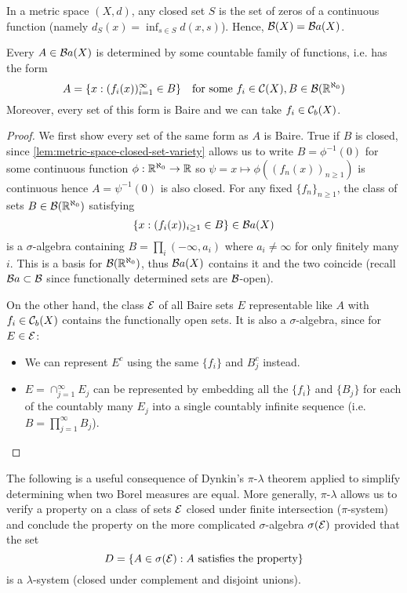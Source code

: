 \begin{lemma}
  \label{lem:metric-space-closed-set-variety}
  In a metric space $(X, d)$, any closed set $S$ is the set of zeros of a continuous
  function (namely $d_S(x) = \inf_{s \in S} d(x,s)$).
  Hence, $\mathcal{B}(X) = \mathcal{B}a(X)$.
\end{lemma}

\begin{lemma}
  \label{lem:baire-set-countably-determined}
  Every $A \in \mathcal{B}a(X)$ is determined by some countable family of functions,
  i.e. has the form
  \[
  A = \{x : (f_i(x))_{i=1}^\infty \in B \}
  \quad\text{for some}~f_i \in \mathcal{C}(X), B \in \mathcal{B}(\mathbb{R}^{\aleph_0})
  \]
  Moreover, every set of this form is Baire and
  we can take $f_i \in \mathcal{C}_b(X)$.
\end{lemma}

\begin{proof}
  We first show every set of the same form as $A$ is Baire.
  True if $B$ is closed, since \cref{lem:metric-space-closed-set-variety}
  allows us to write $B = \phi^{-1}(0)$ for some continuous function $\phi :
  \mathbb{R}^{\aleph_0} \to \mathbb{R}$ so $\psi = x \mapsto \phi((f_n(x))_{n \geq 1})$ is
  continuous hence $A = \psi^{-1}(0)$ is also closed.
  For any fixed $\{f_n\}_{n \geq 1}$, the class of
  sets $B \in \mathcal{B}(\mathbb{R}^{\aleph_0})$ satisfying
  \[
    \{ x : (f_i(x))_{i \geq 1} \in B \} \in \mathcal{B}a(X)
  \]
  is a $\sigma$-algebra containing
  $B = \prod_{i} (-\infty, a_i)$
  where $a_i \neq \infty$ for only finitely many $i$.
  This is a basis for $\mathcal{B}(\mathbb{R}^{\aleph_0})$, thus $\mathcal{B}a(X)$
  contains it and the two coincide (recall $\mathcal{B}a \subset \mathcal{B}$ since
  functionally determined sets are $\mathcal{B}$-open).

  On the other hand, the class $\mathcal{E}$ of all Baire sets $E$
  representable like $A$ with $f_i \in \mathcal{C}_b(X)$ contains
  the functionally open sets. It is also a $\sigma$-algebra, since
  for $E \in \mathcal{E}$:
  \begin{itemize}
    \item We can represent $E^c$ using the same $\{f_i\}$
      and $B_j^c$ instead.
    \item $E = \cap_{j=1}^\infty E_j$ can be represented by
      embedding all the $\{f_i\}$ and $\{B_j\}$ for each
      of the countably many $E_j$ into a single countably
      infinite sequence (i.e. $B = \prod_{j=1}^\infty B_j$).
  \end{itemize}
\end{proof}

The following is a useful consequence of Dynkin's $\pi$-$\lambda$ theorem
applied to simplify determining when two Borel measures are equal.
More generally, $\pi$-$\lambda$ allows us to verify a property on a
class of sets $\mathcal{E}$ closed under finite intersection ($\pi$-system)
and conclude the property on the more complicated
$\sigma$-algebra $\sigma(\mathcal{E})$ provided that the set
\[
  D = \{ A \in \sigma(\mathcal{E}) : \text{$A$ satisfies the property}\}
\]
is a $\lambda$-system (closed under complement and disjoint unions).

